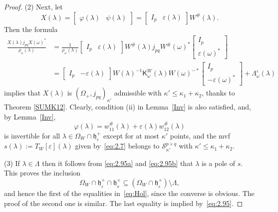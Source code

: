 \documentclass[12pt,twoside,a4paper]{amsart}
\theoremstyle{definition}
\numberwithin{equation}{section}
\begin{document}
\begin{proof}
(2) Next, let
\[
X(\lambda)=\begin{bmatrix}\varphi(\lambda) &
\psi(\lambda)\end{bmatrix}=\begin{bmatrix}I_p
&\varepsilon(\lambda)\end{bmatrix}W^\#(\lambda).
\]
Then the formula
\[
\begin{split}
 \frac{X(\lambda)j_{pq}X(\omega)^*}{\rho_\omega(\lambda)}&=
\frac{1}{\rho_\omega(\lambda)}\begin{bmatrix}I_p
&\varepsilon(\lambda)\end{bmatrix}W^\#(\lambda)
j_{pq}W^\#(\omega)^*\left[\begin{array}{c}
   I_p\\
   \varepsilon(\omega)^*
\end{array}\right]\\
&=
\begin{bmatrix}I_p
&-\varepsilon(\lambda)\end{bmatrix}W(\lambda)^{-1}
{\mathsf K}_\omega^W(\lambda)W(\omega)^{-*}\left[\begin{array}{c}
   I_p\\
   -\varepsilon(\omega)^*
\end{array}\right]+{\mathsf \Lambda}_\omega^\varepsilon (\lambda)
\end{split}
\]
implies that $X(\lambda)$ is $(\Omega_+, j_{pq})_{\kappa'}$
admissible with $\kappa'\leq\kappa_1+\kappa_2$, thanks to Theorem
\ref{SUMK12}. Clearly, condition (ii) in Lemma~\ref{Inv} is also
satisfied, and, by Lemma~\ref{Inv},
\[
 \varphi(\lambda)=w_{11}^\#(\lambda)+\varepsilon(\lambda)w_{12}^\#(\lambda)
 \]
is invertible for all $\lambda\in\Omega_W\cap {{\mathfrak h}}_\varepsilon^+$
except for at most $\kappa'$ points, and the mvf
$s(\lambda):=T_W[\varepsilon](\lambda)$ given by~\eqref{eq:2.7}
belongs to ${\mathcal S}_{\kappa'}^{p\times q}$ with
$\kappa'\leq\kappa_1+\kappa_2$.

(3) If ${\lambda}\in\Lambda$ then it follows from \eqref{eq:2.95a} and
\eqref{eq:2.95b} that ${\lambda}$ is a pole of $s$. This proves the
inclusion
\[
\Omega_W\cap {{\mathfrak h}}_\varepsilon^+\cap {{\mathfrak h}}_s^+\subseteq (\Omega_W\cap
{{\mathfrak h}}_\varepsilon^+)\setminus\Lambda,
\]
and hence the first of the equalities in~\eqref{eq:Hol}, since the
converse is obvious. The proof of the second one is similar. The last equality is implied by~\eqref{eq:2.95}.
\end{proof}
\end{document}
